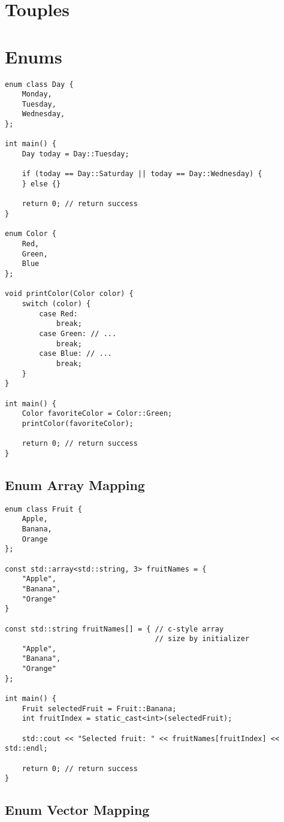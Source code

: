 \section{Touples}


\section{Enums}

\begin{verbatim}
enum class Day {
    Monday,
    Tuesday,
    Wednesday,
};

int main() {
    Day today = Day::Tuesday;

    if (today == Day::Saturday || today == Day::Wednesday) {
    } else {}

    return 0; // return success
}

enum Color {
    Red,
    Green,
    Blue
};

void printColor(Color color) {
    switch (color) {
        case Red:
            break;
        case Green: // ...
            break;
        case Blue: // ...
            break;
    }
}

int main() {
    Color favoriteColor = Color::Green;
    printColor(favoriteColor);

    return 0; // return success
}
\end{verbatim}

\subsection{Enum Array Mapping}

\begin{verbatim}
enum class Fruit {
    Apple,
    Banana,
    Orange
};

const std::array<std::string, 3> fruitNames = {
    "Apple",
    "Banana",
    "Orange"
}

const std::string fruitNames[] = { // c-style array
                                   // size by initializer
    "Apple",
    "Banana",
    "Orange"
};

int main() {
    Fruit selectedFruit = Fruit::Banana;
    int fruitIndex = static_cast<int>(selectedFruit);

    std::cout << "Selected fruit: " << fruitNames[fruitIndex] << std::endl;

    return 0; // return success
}
\end{verbatim}

\subsection{Enum Vector Mapping}

